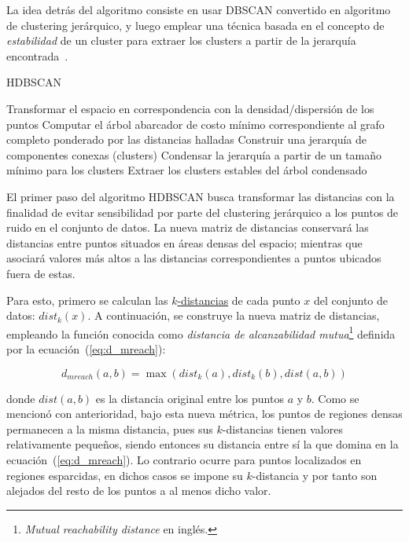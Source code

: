 La idea detrás del algoritmo consiste en usar DBSCAN convertido en algoritmo de clustering jerárquico, y luego emplear una técnica basada en el concepto de \textit{estabilidad} de un cluster para extraer los clusters a partir de la jerarquía encontrada~\cite{McInnes17}.

\begin{algorithm}
    \caption{HDBSCAN}
    \label{algorithm:HDBSCAN}
    Transformar el espacio en correspondencia con la densidad/dispersión de los puntos\;
    Computar el árbol abarcador de costo mínimo correspondiente al grafo completo ponderado por las distancias halladas\;
    Construir una jerarquía de componentes conexas (clusters)\;
    Condensar la jerarquía a partir de un tamaño mínimo para los clusters\;
    Extraer los clusters estables del árbol condensado\;
\end{algorithm}

El primer paso del algoritmo HDBSCAN busca transformar las distancias con la finalidad de evitar sensibilidad por parte del clustering jerárquico a los puntos de ruido en el conjunto de datos.
La nueva matriz de distancias conservará las distancias entre puntos situados en áreas densas del espacio;
mientras que asociará valores más altos a las distancias correspondientes a puntos ubicados fuera de estas.

Para esto, primero se calculan las \hyperref[subsubsec:paramsDBSCAN]{$k$-distancias} de cada punto $x$ del conjunto de datos: $dist_k(x)$.
A continuación, se construye la nueva matriz de distancias, empleando la función conocida como \textit{distancia de alcanzabilidad mutua}\footnote{\textit{Mutual reachability distance} en inglés.} definida por la ecuación~(\ref{eq:d_mreach}):

\begin{equation}
    \label{eq:d_mreach}
    d_{mreach}(a,b)=\max(dist_k(a), dist_k(b), dist(a,b))
\end{equation}

\noindent
donde $dist(a,b)$ es la distancia original entre los puntos $a$ y $b$.
Como se mencionó con anterioridad, bajo esta nueva métrica, los puntos de regiones densas permanecen a la misma distancia, pues sus $k$-distancias tienen valores relativamente pequeños, siendo entonces su distancia entre sí la que domina en la ecuación~(\ref{eq:d_mreach}).
Lo contrario ocurre para puntos localizados en regiones esparcidas, en dichos casos se impone su $k$-distancia y por tanto son alejados del resto de los puntos a al menos dicho valor.


